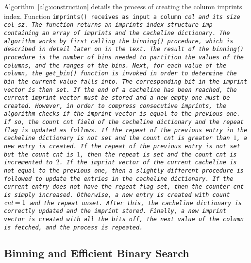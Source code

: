 Algorithm~\ref{alg:construction} details the process of creating the column
imprints index. Function \tt{imprints()} receives as input a column
\it{col} and its size \it{col\_sz}. The function returns an imprints index
structure \it{imp} containing an array of imprints and the cacheline
dictionary. The algorithm works by first calling the \tt{binning()}
procedure, which is described in detail later on in the text. The result
of the \tt{binning()} procedure is the number of bins needed to partition
the values of the columns, and the ranges of the bins. Next, for each value of
the column, the \tt{get\_bin()} function is invoked in order to determine the
bin the current value falls into. The corresponding bit in the imprint vector
is then set. If the end of a cacheline has been reached, the current imprint
vector must be stored and a new empty one must be created. However, in order
to compress consecutive imprints, the algorithm checks if the imprint vector is
equal to the previous one. If so, the count \it{cnt} field of the cacheline
dictionary and the \it{repeat} flag is updated as follows. If the \it{repeat}
of the previous entry in the cacheline dictionary is not set and the count
\it{cnt} is greater than $1$, a new entry is created. If the \it{repeat}
of the previous entry is not set but the count \it{cnt} is
$1$, then the \it{repeat} is set and the count \it{cnt} is incremented to
$2$. If the imprint vector of the current cacheline is not equal to the
previous one, then a slightly different procedure is followed to update the
entries in the cacheline dictionary. If the current entry does not have the
\it{repeat} flag set, then the counter \it{cnt} is simply increased. Otherwise,
a new entry is created with count $\it{cnt}=1$ and the \it{repeat} unset.
After this, the cacheline dictionary is correctly updated and the imprint
stored. Finally, a new imprint vector is created with all the bits off, the
next value of the column is fetched, and the process is repeated.

\subsection{Binning and Efficient Binary Search}

